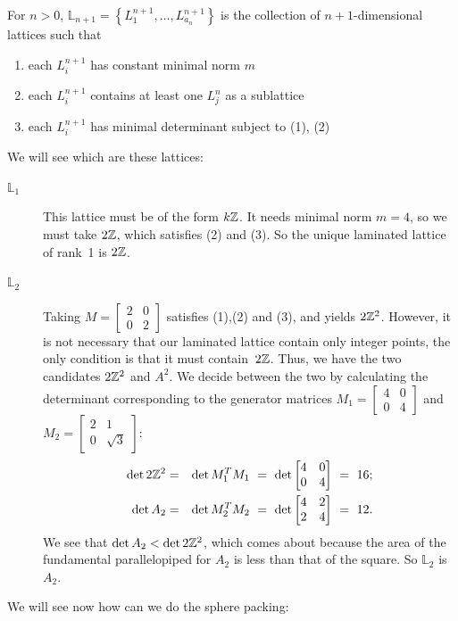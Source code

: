 For $n>0$, $\mathbb{L}_{n+1}=\left\{L_1^{n+1},\ldots,L_{a_n}^{n+1}\right\}$ is the collection of $n+1$-dimensional lattices such that
\begin{enumerate}
\item each $L_i^{n+1}$ has constant minimal norm $m$
\item each $L_i^{n+1}$ contains at least one $L_j^n$ as a sublattice
\item each $L_i^{n+1}$ has minimal determinant subject to (1), (2)
\end{enumerate}


We will see which are these lattices:

\begin{description}
\item[$\mathbb{L}_1$] This lattice must be of the form  $k\mathbb{Z}$.
It needs minimal norm $m=4$, so we must take $2\mathbb{Z}$, which satisfies (2) and (3).
So the unique laminated lattice of rank~1 is $2\mathbb{Z}$.


\item[$\mathbb{L}_2$] Taking $M=\left[\begin{smallmatrix}
      2 & 0 \\
      0 & 2\end{smallmatrix}\right]$ satisfies (1),(2) and (3), and yields
  $2\mathbb{Z}^{2}$. However, it is not necessary that our laminated lattice contain only integer
  points, the only condition is that it must contain~$2\mathbb{Z}$. Thus, we have the two
  candidates $2\mathbb{Z}^{2}$ and $A^{2}$. We decide between the two by
  calculating the determinant corresponding to the generator matrices $M_1=
  \left[\begin{smallmatrix}
    4 & 0\\
    0 & 4
  \end{smallmatrix}\right]$ and $M_2 = \left[\begin{smallmatrix}
        2 & 1 \\
        0 & \sqrt{3} \end{smallmatrix}\right]$:
  \begin{eqnarray*}
    \det 2\mathbb{Z}^{2} 
    & = & 
    \det M_1^{T}M_1 \ = \ \det\begin{bmatrix}
        4 & 0 \\
        0 & 4 \end{bmatrix} \ = \ 16;
      \\
    \det A_2
    &=& 
    \det M_2^{T}M_2 \ = \ \det\begin{bmatrix}
        4 & 2 \\
        2 & 4 \end{bmatrix} \ = \ 12.
\end{eqnarray*}
We see that $\det A_2 < \det 2\mathbb{Z}^{2}$, which comes about because the area of the
fundamental parallelopiped for $A_2$ is less than that of the square. So $\mathbb{L}_2$
is~$A_2$.
\end{description}
We will see now how can we do the sphere packing:

